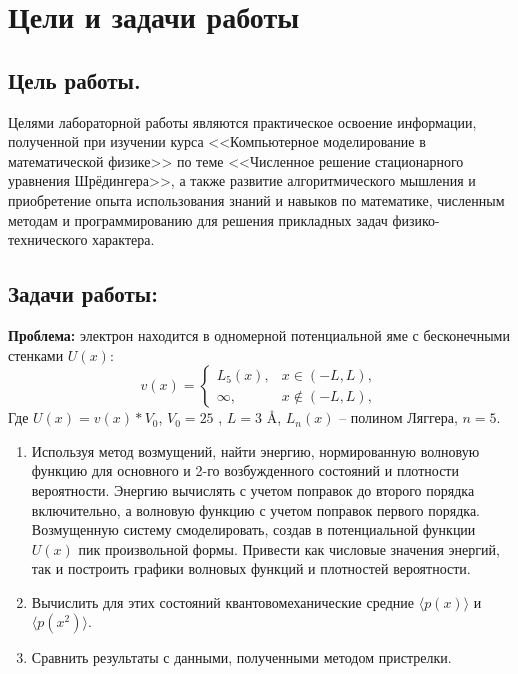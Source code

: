 \documentclass[a4paper,12pt]{article}
\begin{document}
\newpage
\tableofcontents
\pagestyle{plain}
\setcounter{page}{2}

\newpage
\section{Цели и задачи работы}\label{sec:goals}
\subsection{Цель работы.}\label{subsec:-.}
Целями лабораторной работы являются практическое освоение информации,
полученной при изучении курса <<Компьютерное моделирование в математической физике>> по теме <<Численное решение стационарного уравнения Шрёдингера>>,
а также развитие алгоритмического мышления и приобретение опыта использования знаний и навыков по математике,
численным методам и программированию для решения прикладных задач физико-технического характера.

\subsection{Задачи работы:}\label{subsec:-:}

\textbf{Проблема:} электрон находится в одномерной потенциальной яме с бесконечными стенками $U(x)$:
\[
v(x) =
    \begin{cases}
        L_5(x), & x \in (-L, L), \\
        \infty, & x \notin (-L, L),
    \end{cases}
\]
Где $U(x) = v(x)*V_0$, $V_0 = 25$ , $L = 3$ \AA, $L_n(x)$ -- полином Ляггера, $n = 5$.

\begin{enumerate}
    \item Используя метод возмущений, найти энергию, нормированную волновую функцию для основного и 2-го возбужденного состояний и плотности вероятности.
          Энергию вычислять с учетом поправок до второго порядка включительно, а волновую функцию с учетом поправок первого порядка.
          Возмущенную систему смоделировать, создав в потенциальной функции $U(x)$ пик произвольной формы.
          Привести как числовые значения энергий, так и построить графики волновых функций и плотностей вероятности.
    \item Вычислить для этих состояний квантовомеханические средние $\langle p(x) \rangle$ и $ \langle p(x^2) \rangle $.
    \item Сравнить результаты с данными, полученными методом пристрелки.
\end{enumerate}
\end{document}
